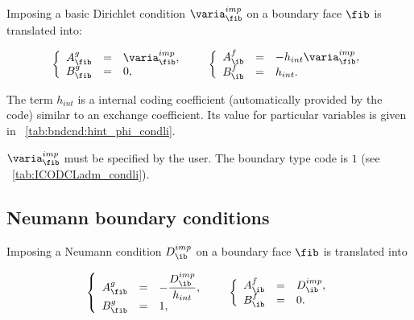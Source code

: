 Imposing a basic Dirichlet condition $\varia^{imp}_\fib$ on a boundary face $\fib$ is translated into:

\begin{equation}
\begin{array}{r c l}
\left\lbrace
\begin{array}{r c l}
A^g_\fib & = &\varia^{imp}_\fib , \\
B^g_\fib & = & 0,
\end{array}
\right.
 & &
\left\lbrace
\begin{array}{r c l}
A^f_\ib & = & -h_{int} \varia^{imp}_\fib, \\
B^f_\ib & = & h_{int}.
\end{array}
\right.
\end{array}
\end{equation}

The term $h_{int}$ is a internal coding coefficient (automatically provided by the code) similar to an exchange coefficient. Its value for particular variables is
given in \tablename~\ref{tab:bndcnd:hint_phi_condli}.

\begin{remark}
$\varia^{imp}_\fib$ must be specified by the user. The boundary type code is $1$ (see \tablename~\ref{tab:ICODCLadm_condli}).
\end{remark}


\subsection{Neumann boundary conditions}

Imposing a Neumann condition $D^{imp}_\ib$ on a boundary face $\fib$
 is translated into

\begin{equation}
\begin{array}{r c l}
\left\lbrace
\begin{array}{r c l}
A^g_\fib & = & - \dfrac{D^{imp}_\ib}{h_{int}} ,\\
B^g_\fib & = & 1,
\end{array}
\right.
& &
\left\lbrace
\begin{array}{r c l}
A^f_\ib & = & D^{imp}_\ib ,\\
B^f_\ib & = & 0 .
\end{array}
\right.
\end{array}
\end{equation}

